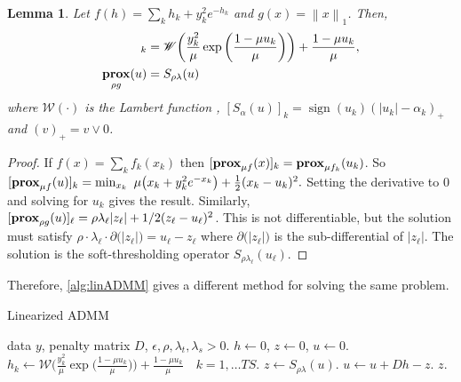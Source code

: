 \documentclass{article}
\newtheorem{lemma}[theorem]{Lemma}
\newcommand{\norm}[1]{\left\lVert #1 \right\rVert}
\DeclareMathOperator*{\prox}{\bf prox}
\DeclareMathOperator*{\sign}{sign}
\begin{document}
\begin{lemma}
  Let $f(h) = \sum_{k} h_{k} + y_{k}^2e^{-h_{k}}$ and $g(x) =
  \norm{x}_1$. Then, 
  \begin{align}
    [\prox_{\mu f}(u)]_k &= \mathscr{W}\bigg(\frac{y_k^2}{\mu}
    \exp\bigg(\frac{1-\mu u_k}{\mu}\bigg) \bigg) + \frac{1-\mu u_k}{\mu},\\
    \prox_{\rho g}(u) &= S_{\rho\lambda}(u)
  \end{align}
where $\mathscr{W}(\cdot)$ is the \textit{Lambert function} \cite{corless_lambertw_1996},  $[S_{\alpha}(u)]_k = \sign(u_k)(|u_k| -\alpha_k)_+$ and
$(v)_+=v\vee 0$.
\end{lemma}
\begin{proof}
  If $f(x)=\sum_k f_k(x_k)$ then $[\prox_{\mu f}(x)]_k =
  \prox_{\mu f_k}(u_k)$. So 
  $[\prox_{\mu f}(u)]_k=\min_{x_k} \,\,
  \mu\big(x_k+y_{k}^2e^{-x_{k}}\big)+\frac{1}{2}  (x_k-u_k)^2.$
  Setting the derivative to 0 and solving for $u_k$ gives the
  result. Similarly, $[\prox_{\rho g}(u)]_\ell=\rho
  \lambda_\ell |z_\ell|+1/2(z_\ell-u_\ell)^2$. This is not differentiable,
  but the solution must satisfy $\rho \cdot \lambda_\ell \cdot \partial
  \big(|z_\ell| \big)=u_\ell-z_\ell$ where $\partial \big(|z_\ell| \big)$ is the
  sub-differential of $|z_\ell|$. The solution is the soft-thresholding
  operator $S_{\rho\lambda_\ell}(u_\ell)$.
\end{proof}

Therefore, \autoref{alg:linADMM} gives a different method for solving
the same problem.

\begin{algorithm}[tb]
  \caption{Linearized ADMM }
  \label{alg:linADMM}
  \begin{algorithmic}
     data $y$, penalty matrix $D$, 
    $\epsilon, \rho,\lambda_t,\lambda_s >0$.
     $h\leftarrow 0$, $z\leftarrow 0$, $u\leftarrow
    0$.  
    \REPEAT
    \STATE $h_k\leftarrow \mathscr{W}\bigg(\frac{y_k^2}{\mu} 
    \exp\bigg(\frac{1-\mu u_k}{\mu}\bigg) \bigg) + \frac{1-\mu
      u_k}{\mu}\quad k=1,\ldots TS$. 
    \STATE $z\leftarrow S_{\rho\lambda}(u)$. 
    \STATE $u\leftarrow u + Dh-z$. 
    \UNTIL {$\max\{\norm{h-z}_2^2,\; \norm{z^{m+1}-z^m}_2^2\} < \epsilon$}
     $z$.
  \end{algorithmic}
\end{algorithm}
\end{document}

